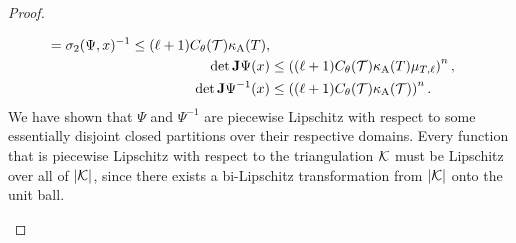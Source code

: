 \documentclass[10pt,a4paper]{article}
\newcommand{\mwl}[1]{{\color{red}#1}}
\begin{document}
\begin{proof}
\begin{itemize}
\begin{align}
            =
            \sigma_{  2}(\Psi,x)^{-1} 
            \leq 
            (\ell+1) \diameterratio(\calT) \aspectratio(T) 
            ,
            \\
            \det\Jacobian\Psi(x)
            &\leq 
            \left( 
            (\ell+1)
            \diameterratio(\calT)
            \aspectratio(T)\mu_{T,\ell} %
            \right)^{n},
            \\
            \det\Jacobian\Psi^{-1}(x)
            &\leq 
            \left( 
            (\ell+1)
            \diameterratio(\calT)
            \aspectratio(\calT) 
            \right)^{n}
            .
        \end{align}
        We have shown that $\Psi$ and $\Psi^{-1}$ are piecewise Lipschitz with respect to some essentially disjoint closed partitions over their respective domains.
        Every function that is piecewise Lipschitz with respect to the triangulation ${\mathcal K}$ must be Lipschitz over all of $\left| {\mathcal K} \right|$, since there exists a bi-Lipschitz transformation from $\left| {\mathcal K} \right|$ onto the unit ball.
        

\end{itemize}
\end{proof}
\end{document}
